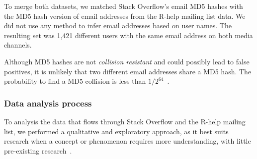 
To merge both datasets, we matched Stack Overflow's email MD5 hashes with the MD5 hash version of email addresses from the R-help mailing list data.
We did not use any method to infer email addresses based on user names.
The resulting set was 1,421 different users with the same email address on both media channels.


Although MD5 hashes are not \textit{collision resistant} and could possibly lead to false positives, it is unlikely that two different email addresses share a MD5 hash.
    The probability to find a MD5 collision is less than $1/2^{64}$~\cite{Rivest1992}.

\subsubsection{Data analysis process}
\label{sec:dap}

To analysis the data that flows through Stack Overflow and the R-help mailing list, we performed a qualitative and exploratory approach, as it best suits research when a concept or phenomenon requires more understanding, with little pre-existing research~\cite{Creswell2009}.

